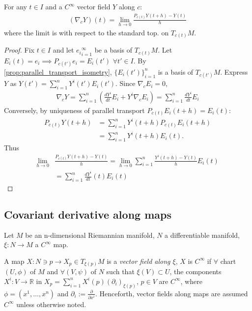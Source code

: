 \begin{proposition}\label{prop:covariant_derivative_along_curves_limit}
    For any $t \in I$ and a $C^{\infty}$ vector field $Y$ along $c$:
    \[\begin{aligned}
        (\nabla_c Y)(t) = \lim_{h \to 0} \frac{P_{c(t)} Y(t+h) - Y(t)}{h}
    \end{aligned}\]
    where the limit is with respect to the standard top. on $T_{c(t)}M$.
\end{proposition}

\begin{proof}
    Fix $t\in I$ and let ${e_i}_{i=1}^{\infty}$ be a basis of $T_{c(t)}M$.
    Let $E_i(t) = e_i \implies P_{c(t')}e_i = E_i(t')$ $\forall t' \in I$.
    By \autoref{prop:parallel_transport_isometry}, $\{E_i(t')\}_{i=1}^{n}$ is a basis of $T_{c(t')}M$.
    Express $Y$ as $Y(t') = \sum_{i=1}^n Y^i(t')E_i(t')$.
    Since $\nabla_c E_i = 0$,
    \[\begin{aligned}
        \nabla_c Y = \sum^n_{i=1} \left( \frac{dY^i}{dt}E_i + Y^i \nabla_c E_i\right) = \sum_{i=1}^n \frac{dY^i}{dt} E_i 
    \end{aligned}\]
    Conversely, by uniqueness of parallel transport $P_{c(t)}E_i (t+h) = E_i(t)$:
    \[\begin{aligned}
        P_{c(t)} Y(t+h) &= \sum_{i=1}^n Y^i(t+h) P_{c(t)} E_i(t+h) \\
        &= \sum_{i=1}^n Y^i(t+h) E_i(t).
    \end{aligned}\]
    Thus 
    \[\begin{aligned}
        \lim_{h \to 0} &\frac{P_{c(t)}Y(t+h)-Y(t)}{h} = \lim_{h \to 0} \sum^n_{i=1} \frac{Y^i(t+h)-Y(t)}{h} E_i (t) \\
        &= \sum_{i=1}^n \frac{dY^i}{dt}(t)E_i (t)
    \end{aligned}\]
\end{proof}

\subsection{Covariant derivative along maps}

Let $M$ be an n-dimensional Riemannian manifold, $N$ a differentiable manifold, $\xi:N \to M$ a $C^{\infty}$ map.

\begin{definition}
    A map $X: N \owns p \to X_p \in T_{\xi(p)}M$ is a \emph{vector field along $\xi$}, $X$ is $C^{\infty}$ if $\forall$ chart $(U, \phi)$ of $M$ and $\forall (V, \psi)$ of $N$ such that $\xi(V) \subset U$,
    the components $X^i: V \to \mathbb{R}$ in $X_p = \sum_{i=1}^n X^i(p)(\partial_i)_{\xi(p)}$, $p\in V$ are $C^{\infty}$, where 
$\phi = (x^1, \dots, x^n)$ and $\partial_i := \frac{\partial}{\partial x^i}$.
Henceforth, vector fields along maps are assumed $C^{\infty}$ unless otherwise noted.
\end{definition}

